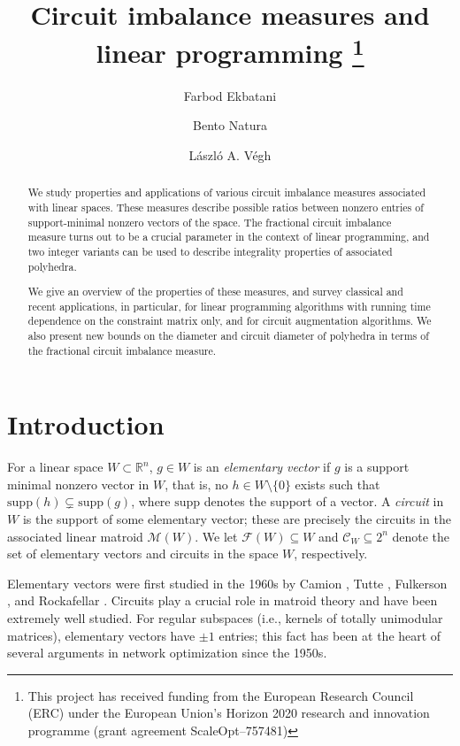 \documentclass[11pt, a4paper]{article}
\title{Circuit imbalance measures and linear programming
\thanks{This project has received funding from the European Research Council (ERC) under the European Union's Horizon 2020 research and innovation programme (grant agreement ScaleOpt--757481)}
}
\author{Farbod Ekbatani}
\author{Bento Natura}
\author{L{\'{a}}szl{\'{o}} A. V{\'{e}}gh}
\affil{London School of Economics and Political Science \protect\\
 \texttt{\{F.Ekbatani, B.Natura, L.Vegh\}@lse.ac.uk}}
\newcommand{\circuits}{\mathcal{C}}
\newcommand{\supp}{\mathrm{supp}}
\newcommand{\1}{\mathbbm{1}}
\newcommand{\EE}{\mathcal F}
\theoremstyle{case}
\newcommand{\R}{\mathbb{R}}
\begin{document}
\maketitle

\begin{abstract}
We study properties and applications of various circuit imbalance measures associated with linear spaces.
These measures describe possible ratios between nonzero entries of 
support-minimal nonzero vectors of  the space. The fractional circuit imbalance measure turns out to be a crucial parameter in the context of linear programming, and two integer variants can be used to describe integrality properties of associated polyhedra. 

We give an overview of the properties of these measures, and survey classical and recent applications, in particular, for linear programming algorithms with running time dependence on the constraint matrix only, and for circuit augmentation algorithms. We also present new bounds on the diameter and circuit diameter of polyhedra in terms of the fractional circuit imbalance measure.
\end{abstract}

\tableofcontents

\newpage

\listoftodos

\section{Introduction}
\label{sec:intro}

For a linear space $W\subset \R^n$, $g\in W$  is an 
 \emph{elementary vector} if $g$ is a support minimal nonzero vector in $W$, that is, no $h\in W\setminus\{0\}$ exists such that $\supp(h)\subsetneq \supp(g)$, where $\supp$ denotes the support of a vector. 
 A \emph{circuit} in $W$ is the support of some elementary vector; these are precisely the circuits in the associated  linear matroid $\mathcal{M}(W)$. We let $\EE(W)\subseteq W$ and $\circuits_W\subseteq 2^n$
 denote the set of elementary vectors and circuits in the space $W$, respectively.

Elementary vectors were first studied in the 1960s by Camion \cite{camion1964}, Tutte \cite{Tutte1965}, Fulkerson \cite{Fulkerson1968}, and Rockafellar \cite{RockafellarTheEV}.
Circuits play a crucial role in matroid theory and have been extremely well studied.  
For regular subspaces (i.e., kernels of totally unimodular matrices), elementary vectors have $\pm 1$ entries; this fact has been at the heart of several arguments in network optimization since the 1950s. 
\end{document}

